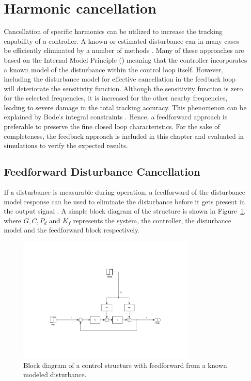 \section{Harmonic cancellation}
Cancellation of specific harmonics can be utilized to increase the tracking capability of a controller. A known or estimated disturbance can in many cases be efficiently eliminated by a number of methods \citep{fujimoto2009rro, fujimoto2004repetitive, vilanova2008disturbance}. Many of these approaches are based on the Internal Model Principle (\abbrIMP) meaning that the controller incorporates a known model of the disturbance within the control loop itself. However, including the disturbance model for effective cancellation in the feedback loop will deteriorate the sensitivity function. Although the sensitivity function is zero for the selected frequencies, it is increased for the other nearby frequencies, leading to severe damage in the total tracking accuracy. This phenomenon can be explained by Bode's integral constraints \citep{Ljung:2003}. Hence, a feedforward approach is preferable to preserve the fine closed loop characteristics. For the sake of completeness, the \abbrIMP feedback approach is included in this chapter and evaluated in simulations to verify the expected results.

\subsection{Feedforward Disturbance Cancellation}\label{subsec:distff}
If a disturbance is measurable during operation, a feedforward of the disturbance model response can be used to eliminate the disturbance before it gets present in the output signal \citep{industrial}. A simple block diagram of the structure is shown in Figure~\ref{fig:ffdist}, where $G, C, P_d$ and $K_f$ represents the system, the controller, the disturbance model and the feedforward block respectively.

\begin{figure}[h]
  \centering %
  \includegraphics[width=0.8\textwidth, trim=8cm 4.5cm 5.97cm 8.5cm, clip=true]{fig/matlab/ffdist}
  \caption{\label{fig:ffdist}Block diagram of a control structure with feedforward from a known modeled disturbance.}
\end{figure}

